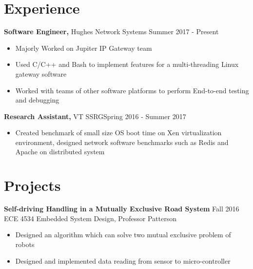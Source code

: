 \documentclass[margin]{res}
\begin{document}
\begin{resume}
  
\section{Experience} %

 {\bf Software Engineer,} Hughes Network Systems \hfill Summer 2017 - Present
 \begin{itemize} \itemsep -2pt  %
 \item Majorly Worked on Jupiter IP Gateway team
 \item Used C/C++ and Bash to implement features for a multi-threading Linux gateway software
 \item Worked with teams of other software platforms to perform End-to-end testing and debugging
 \end{itemize}

 {\bf Research Assistant,} VT SSRG\hfill Spring 2016 - Summer 2017
 \begin{itemize} \itemsep -2pt  %
 \item Created benchmark of small size OS boot time on Xen virtualization environment,
	   designed network software benchmarks such as Redis and Apache on distributed system
 \end{itemize}



\section{Projects} 
               {\bf Self-driving Handling in a Mutually Exclusive Road System}     \hfill         Fall 2016  \\           
                {ECE 4534 Embedded System Design, Professor Patterson} 
                 \begin{itemize} \itemsep -2pt
                 \item Designed an algorithm which can solve two mutual exclusive problem of robots
                 
                 \item  Designed and implemented data reading from sensor to micro-controller


\end{itemize}
\end{resume}
\end{document}

